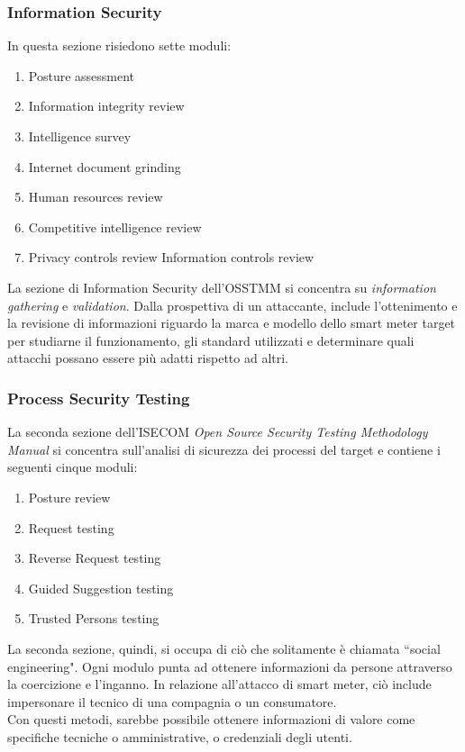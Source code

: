 \subsubsection{Information Security}
In questa sezione risiedono sette moduli:
\begin{enumerate}
	\item Posture assessment
	\item Information integrity review
	\item Intelligence survey
	\item Internet document grinding
	\item Human resources review
	\item Competitive intelligence review
	\item Privacy controls review
	Information controls review
\end{enumerate}
La sezione di Information Security dell'OSSTMM si concentra su \emph{information gathering} e \emph{validation}. Dalla prospettiva di un attaccante, include l'ottenimento e la revisione di informazioni riguardo la marca e modello dello smart meter target per studiarne il funzionamento, gli standard utilizzati e determinare quali attacchi possano essere più adatti rispetto ad altri.


\subsubsection{Process Security Testing}
La seconda sezione dell'ISECOM \emph{Open Source Security Testing Methodology Manual} si concentra sull'analisi di sicurezza dei processi del target e contiene i seguenti cinque moduli:
\begin{enumerate}
	\item Posture review
	\item Request testing
	\item Reverse Request testing
	\item Guided Suggestion testing
	\item Trusted Persons testing
\end{enumerate}

La seconda sezione, quindi, si occupa di ciò che solitamente è chiamata ``social engineering". Ogni modulo punta ad ottenere informazioni da persone attraverso la coercizione e l'inganno. In relazione all'attacco di smart meter, ciò include impersonare il tecnico di una compagnia o un consumatore.\\
Con questi metodi, sarebbe possibile ottenere informazioni di valore come specifiche tecniche o amministrative, o credenziali degli utenti.

